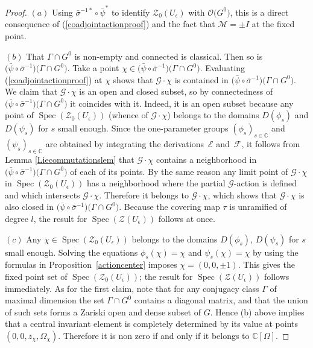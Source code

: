 \documentclass[pdftex]{sigma}%
\numberwithin{equation}{section}
\numberwithin{figure}{section}
\newcommand{\mc}{\mathbb{C}}
\newcommand{\Gg}{{\mathcal G}}
\begin{document}
\begin{proof} $(a)$ Using $\bar \sigma^{-1*}\circ \bar{\psi}^*$ to identify $\mathcal{Z}_0(U_\epsilon)$ with $\mathcal{O}\big(G^0\big)$, this is a direct consequence of (\ref{coadjointactionproof}) and the fact that ${\mathcal M}=\pm I $ at the fixed point.

$(b)$ That $\Gamma \cap G^0$ is non-empty and connected is classical. Then so is $\big(\bar \psi\circ \bar \sigma^{-1}\big)\big(\Gamma \cap G^0\big)$. Take a point $\chi\in \big(\bar \psi\circ \bar \sigma^{-1}\big)\big(\Gamma \cap G^0\big)$. Evaluating (\ref{coadjointactionproof}) at $\chi$ shows that $\mathcal{G}\cdot \chi$ is contained in $\big(\bar \psi\circ \bar \sigma^{-1}\big)\big(\Gamma \cap G^0\big)$. We claim that $\mathcal{G}\cdot \chi$ is an open and closed subset, so by connectedness of $\big(\bar \psi\circ \bar \sigma^{-1}\big)\big(\Gamma \cap G^0\big)$ it coincides with it. Indeed, it is an open subset because any point of $\operatorname{Spec}(\mathcal{Z}_0(U_\epsilon))$ (whence of $\mathcal{G}\cdot \chi$) belongs to the domains $D(\phi_s)$ and $D(\psi_s)$ for $s$ small enough. Since the one-parameter groups $(\phi_s)_{s\in \mathbb C}$ and $(\psi_s)_{s\in \mathbb C}$ are obtained by integrating the derivations~${\mathcal E}$ and~${\mathcal F}$, it follows from Lemma \ref{Liecommutationslem} that $\mathcal{G}\cdot \chi$ contains a neighborhood in $\big(\bar \psi\circ \bar \sigma^{-1}\big)\big(\Gamma \cap G^0\big)$ of each of its points. By the same reason any limit point of $\mathcal{G}\cdot \chi$ in $\operatorname{Spec}(\mathcal{Z}_0(U_\epsilon))$ has a neighborhood where the partial $\Gg$-action is defined and which intersects $\mathcal{G}\cdot \chi$. Therefore it belongs to $\mathcal{G}\cdot \chi$, which shows that $\mathcal{G}\cdot \chi$ is also closed in $\big(\bar \psi\circ \bar \sigma^{-1}\big)\big(\Gamma \cap G^0\big)$. Because the covering map $\tau$ is unramified of degree $l$, the result for $\operatorname{Spec}(\mathcal{Z}(U_\epsilon))$ follows at once.

$(c)$ Any $\chi\in \operatorname{Spec}(\mathcal{Z}_0(U_\epsilon))$ belongs to the domains $D(\phi_s)$, $D(\psi_s)$ for $s$ small enough. Solving the equations $\phi_s(\chi)=\chi$ and $\psi_s(\chi)=\chi$ by using the formulas in Proposition~\ref{actioncenter} imposes $\chi=(0,0,\pm 1)$. This gives the fixed point set of $\operatorname{Spec}(\mathcal{Z}_0(U_\epsilon))$; the result for $\operatorname{Spec}(\mathcal{Z}(U_\epsilon))$ follows immediately. As for the first claim, note that for any conjugacy class $\Gamma$ of maximal dimension the set $\Gamma \cap G^0$ contains a diagonal matrix, and that the union of such sets forms a Zariski open and dense subset of $G$. Hence (b) above implies that a central invariant element is completely determined by its value at points $(0,0,z_\chi,\Omega_\chi)$. Therefore it is non zero if and only if it belongs to $\mc[\Omega]$.


\end{proof}
\end{document}
